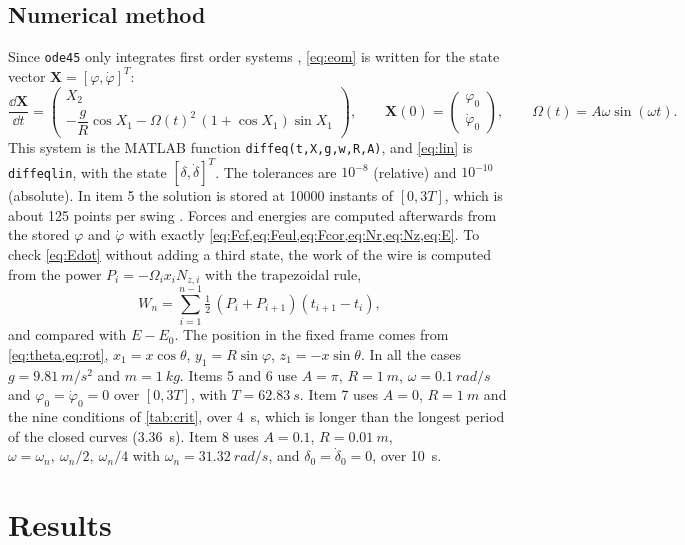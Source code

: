 \documentclass[11pt,a4paper]{article}
\newcommand{\dt}[1]{\dot{#1}}
\begin{document}
\subsection{Numerical method}
Since \texttt{ode45} only integrates first order systems \cite{matlab}, \cref{eq:eom} is written for the state vector $\bm X=[\varphi,\dt\varphi]^T$:
\begin{equation}
\frac{\dd\bm X}{\dd t}=\begin{pmatrix}X_2\\[2pt] -\dfrac gR\cos X_1-\Omega(t)^2\,(1+\cos X_1)\sin X_1\end{pmatrix},\qquad \bm X(0)=\begin{pmatrix}\varphi_0\\ \dt\varphi_0\end{pmatrix},\qquad \Omega(t)=A\omega\sin(\omega t).
\label{eq:system}
\end{equation}
This system is the MATLAB function \texttt{diffeq(t,X,g,w,R,A)}, and \cref{eq:lin} is \texttt{diffeqlin}, with the state $[\delta,\dt\delta]^T$. The tolerances are $10^{-8}$ (relative) and $10^{-10}$ (absolute). In item 5 the solution is stored at \num{10000} instants of $[0,3T]$, which is about 125 points per swing \cite{guidelines}. Forces and energies are computed afterwards from the stored $\varphi$ and $\dt\varphi$ with exactly \cref{eq:Fcf,eq:Feul,eq:Fcor,eq:Nr,eq:Nz,eq:E}. To check \cref{eq:Edot} without adding a third state, the work of the wire is computed from the power $P_i=-\Omega_ix_iN_{z,i}$ with the trapezoidal rule,
\begin{equation}
W_n=\sum_{i=1}^{n-1}\tfrac12\,(P_i+P_{i+1})(t_{i+1}-t_i),
\label{eq:W}
\end{equation}
and compared with $E-E_0$. The position in the fixed frame comes from \cref{eq:theta,eq:rot}, $x_1=x\cos\theta$, $y_1=R\sin\varphi$, $z_1=-x\sin\theta$. In all the cases $g=\SI{9.81}{m/s^2}$ and $m=\SI{1}{kg}$. Items 5 and 6 use $A=\pi$, $R=\SI{1}{m}$, $\omega=\SI{0.1}{rad/s}$ and $\varphi_0=\dt\varphi_0=0$ over $[0,3T]$, with $T=\SI{62.83}{s}$. Item 7 uses $A=0$, $R=\SI{1}{m}$ and the nine conditions of \cref{tab:crit}, over \SI{4}{s}, which is longer than the longest period of the closed curves (\SI{3.36}{s}). Item 8 uses $A=0.1$, $R=\SI{0.01}{m}$, $\omega=\omega_n,\ \omega_n/2,\ \omega_n/4$ with $\omega_n=\SI{31.32}{rad/s}$, and $\delta_0=\dt\delta_0=0$, over \SI{10}{s}.

\section{Results}\label{sec:results}
\end{document}
